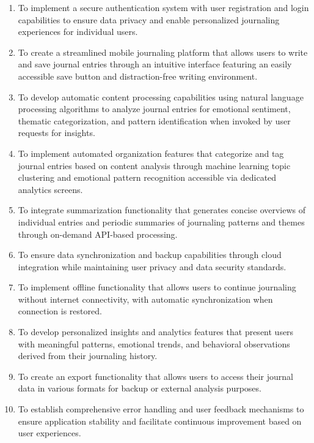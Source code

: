 \begin{enumerate}
	\item To implement a secure authentication system with user registration and login capabilities to ensure data privacy and enable personalized journaling experiences for individual users.
	
	\item To create a streamlined mobile journaling platform that allows users to write and save journal entries through an intuitive interface featuring an easily accessible save button and distraction-free writing environment.
	
	\item To develop automatic content processing capabilities using natural language processing algorithms to analyze journal entries for emotional sentiment, thematic categorization, and pattern identification when invoked by user requests for insights.
	
	\item To implement automated organization features that categorize and tag journal entries based on content analysis through machine learning topic clustering and emotional pattern recognition accessible via dedicated analytics screens.
	
	\item To integrate summarization functionality that generates concise overviews of individual entries and periodic summaries of journaling patterns and themes through on-demand API-based processing.
	
	\item To ensure data synchronization and backup capabilities through cloud integration while maintaining user privacy and data security standards.
	
	\item To implement offline functionality that allows users to continue journaling without internet connectivity, with automatic synchronization when connection is restored.
	
	\item To develop personalized insights and analytics features that present users with meaningful patterns, emotional trends, and behavioral observations derived from their journaling history.
	
	\item To create an export functionality that allows users to access their journal data in various formats for backup or external analysis purposes.
	
	\item To establish comprehensive error handling and user feedback mechanisms to ensure application stability and facilitate continuous improvement based on user experiences.
\end{enumerate}

